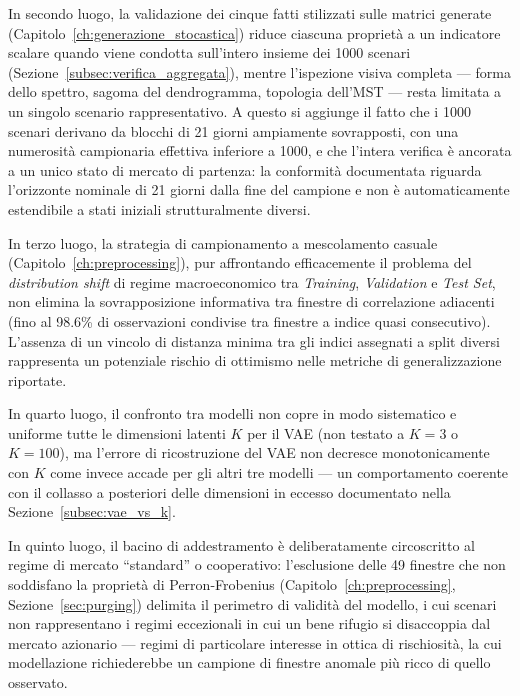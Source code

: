 In secondo luogo, la validazione dei cinque fatti stilizzati sulle matrici generate (Capitolo~\ref{ch:generazione_stocastica}) riduce ciascuna proprietà a un indicatore scalare quando viene condotta sull'intero insieme dei 1000 scenari (Sezione~\ref{subsec:verifica_aggregata}), mentre l'ispezione visiva completa --- forma dello spettro, sagoma del dendrogramma, topologia dell'MST --- resta limitata a un singolo scenario rappresentativo. A questo si aggiunge il fatto che i 1000 scenari derivano da blocchi di 21 giorni ampiamente sovrapposti, con una numerosità campionaria effettiva inferiore a 1000, e che l'intera verifica è ancorata a un unico stato di mercato di partenza: la conformità documentata riguarda l'orizzonte nominale di 21 giorni dalla fine del campione e non è automaticamente estendibile a stati iniziali strutturalmente diversi.

In terzo luogo, la strategia di campionamento a mescolamento casuale (Capitolo~\ref{ch:preprocessing}), pur affrontando efficacemente il problema del \emph{distribution shift} di regime macroeconomico tra \emph{Training}, \emph{Validation} e \emph{Test Set}, non elimina la sovrapposizione informativa tra finestre di correlazione adiacenti (fino al 98.6\% di osservazioni condivise tra finestre a indice quasi consecutivo). L'assenza di un vincolo di distanza minima tra gli indici assegnati a split diversi rappresenta un potenziale rischio di ottimismo nelle metriche di generalizzazione riportate.

In quarto luogo, il confronto tra modelli non copre in modo sistematico e uniforme tutte le dimensioni latenti $K$ per il VAE (non testato a $K=3$ o $K=100$), ma l'errore di ricostruzione del VAE non decresce monotonicamente con $K$ come invece accade per gli altri tre modelli --- un comportamento coerente con il collasso a posteriori delle dimensioni in eccesso documentato nella Sezione~\ref{subsec:vae_vs_k}.

In quinto luogo, il bacino di addestramento è deliberatamente circoscritto al regime di mercato ``standard'' o cooperativo: l'esclusione delle 49 finestre che non soddisfano la proprietà di Perron-Frobenius (Capitolo~\ref{ch:preprocessing}, Sezione~\ref{sec:purging}) delimita il perimetro di validità del modello, i cui scenari non rappresentano i regimi eccezionali in cui un bene rifugio si disaccoppia dal mercato azionario --- regimi di particolare interesse in ottica di rischiosità, la cui modellazione richiederebbe un campione di finestre anomale più ricco di quello osservato.

